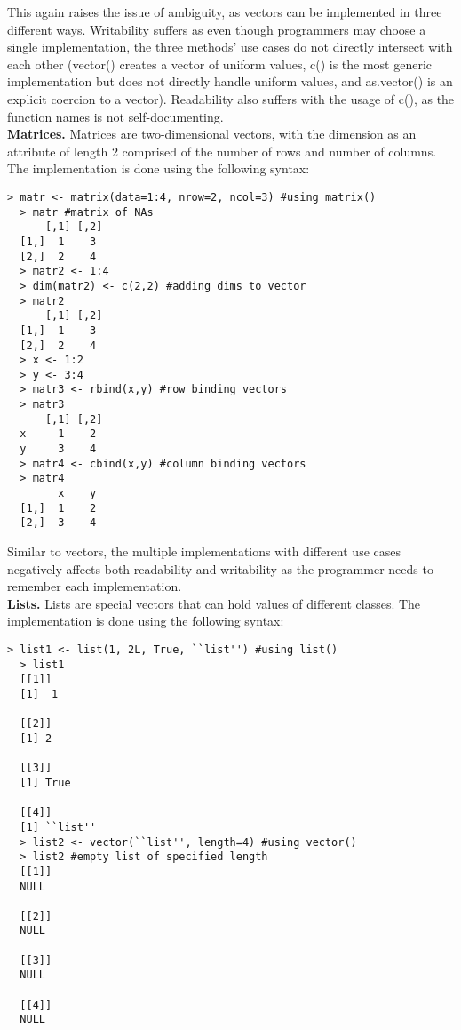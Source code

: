 \documentclass[12pt]{article}
\begin{document}
This again raises the issue of ambiguity, as vectors can be implemented in three different ways. Writability suffers as even though programmers may choose a single implementation, the three methods' use cases do not directly intersect with each other (vector() creates a vector of uniform values, c() is the most generic implementation but does not directly handle uniform values, and as.vector() is an explicit coercion to a vector). Readability also suffers with the usage of c(), as the function names is not self-documenting.\\

\textbf{Matrices.} Matrices are two-dimensional vectors, with the dimension as an attribute of length 2 comprised of the number of rows and number of columns. The implementation is done using the following syntax:

\begin{lstlisting}[frame=single]
  > matr <- matrix(data=1:4, nrow=2, ncol=3) #using matrix()
  > matr #matrix of NAs
      [,1] [,2]
  [1,]  1    3
  [2,]  2    4
  > matr2 <- 1:4
  > dim(matr2) <- c(2,2) #adding dims to vector
  > matr2
      [,1] [,2]
  [1,]  1    3
  [2,]  2    4
  > x <- 1:2
  > y <- 3:4
  > matr3 <- rbind(x,y) #row binding vectors
  > matr3
      [,1] [,2]
  x     1    2
  y     3    4
  > matr4 <- cbind(x,y) #column binding vectors
  > matr4
        x    y
  [1,]  1    2
  [2,]  3    4
\end{lstlisting}

Similar to vectors, the multiple implementations with different use cases negatively affects both readability and writability as the programmer needs to remember each implementation.\\

\textbf{Lists.} Lists are special vectors that can hold values of different classes. The implementation is done using the following syntax:

\begin{lstlisting}[frame=single]
  > list1 <- list(1, 2L, True, ``list'') #using list()
  > list1
  [[1]]
  [1]  1

  [[2]]
  [1] 2

  [[3]]
  [1] True

  [[4]]
  [1] ``list''
  > list2 <- vector(``list'', length=4) #using vector()
  > list2 #empty list of specified length
  [[1]]
  NULL

  [[2]]
  NULL

  [[3]]
  NULL

  [[4]]
  NULL
\end{lstlisting}
\end{document}
